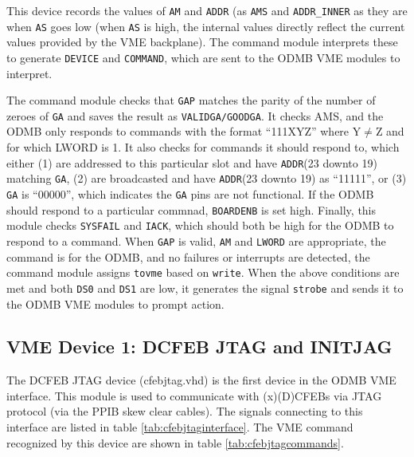 \documentclass[10pt,a4paper]{article}
\begin{document}
This device records the values of \texttt{AM} and \texttt{ADDR} (as \texttt{AMS} and \texttt{ADDR\_INNER} as they are when \texttt{AS} goes low (when \texttt{AS} is high, the internal values directly reflect the current values provided by the VME backplane). The command module interprets these to generate \texttt{DEVICE} and \texttt{COMMAND}, which are sent to the ODMB VME modules to interpret.

The command module checks that \texttt{GAP} matches the parity of the number of zeroes of \texttt{GA} and saves the result as \texttt{VALIDGA/GOODGA}. It checks AMS, and the ODMB only responds to commands with the format ``111XYZ'' where Y$\neq$Z and for which LWORD is 1. It also checks for commands it should respond to, which either (1) are addressed to this particular slot and have \texttt{ADDR}(23 downto 19) matching \texttt{GA}, (2) are broadcasted and have \texttt{ADDR}(23 downto 19) as ``11111'', or (3) \texttt{GA} is ``00000'', which indicates the \texttt{GA} pins are not functional. If the ODMB should respond to a particular commnad, \texttt{BOARDENB} is set high. Finally, this module checks \texttt{SYSFAIL} and \texttt{IACK}, which should both be high for the ODMB to respond to a command. When \texttt{GAP} is valid, \texttt{AM} and \texttt{LWORD} are appropriate, the command is for the ODMB, and no failures or interrupts are detected, the command module assigns \texttt{tovme} based on \texttt{write}. When the above conditions are met and both \texttt{DS0} and \texttt{DS1} are low, it generates the signal \texttt{strobe} and sends it to the ODMB VME modules to prompt action.

\subsection{VME Device 1: DCFEB JTAG and INITJAG}

The DCFEB JTAG device (cfebjtag.vhd) is the first device in the ODMB VME interface. This module is used to communicate with (x)(D)CFEBs via JTAG protocol (via the PPIB skew clear cables). The signals connecting to this interface are listed in table \ref{tab:cfebjtaginterface}. The VME command recognized by this device are shown in table \ref{tab:cfebjtagcommands}.
\end{document}
